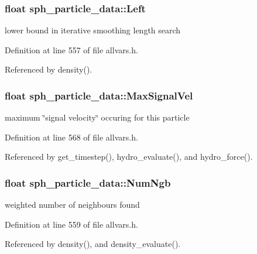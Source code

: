 \hypertarget{structsph__particle__data_a05d75ccc7dbd52562b7211fc74e674af}{
\subsubsection[{Left}]{\setlength{\rightskip}{0pt plus 5cm}float {\bf sph\_\-particle\_\-data::Left}}}
\label{structsph__particle__data_a05d75ccc7dbd52562b7211fc74e674af}
lower bound in iterative smoothing length search 

Definition at line 557 of file allvars.h.



Referenced by density().

\hypertarget{structsph__particle__data_a86da008875968dfca41b35f4ca7f3164}{
\subsubsection[{MaxSignalVel}]{\setlength{\rightskip}{0pt plus 5cm}float {\bf sph\_\-particle\_\-data::MaxSignalVel}}}
\label{structsph__particle__data_a86da008875968dfca41b35f4ca7f3164}
maximum \char`\"{}signal velocity\char`\"{} occuring for this particle 

Definition at line 568 of file allvars.h.



Referenced by get\_\-timestep(), hydro\_\-evaluate(), and hydro\_\-force().

\hypertarget{structsph__particle__data_a8038c8b4be4a553e5c13c9b9e711c5c0}{
\subsubsection[{NumNgb}]{\setlength{\rightskip}{0pt plus 5cm}float {\bf sph\_\-particle\_\-data::NumNgb}}}
\label{structsph__particle__data_a8038c8b4be4a553e5c13c9b9e711c5c0}
weighted number of neighbours found 

Definition at line 559 of file allvars.h.



Referenced by density(), and density\_\-evaluate().

